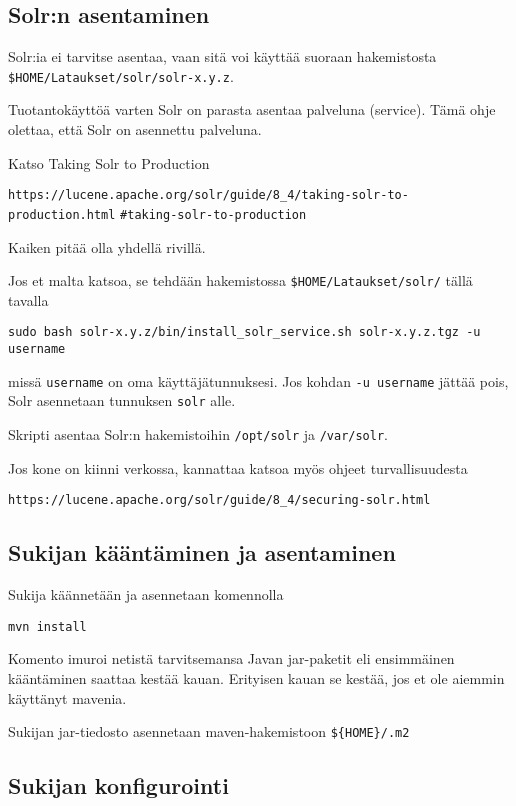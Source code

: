 \documentclass[12pt]{article}
\begin{document}
\subsection*{Solr:n asentaminen}

Solr:ia ei tarvitse asentaa, vaan sitä voi käyttää suoraan
hakemistosta \verb=$HOME/Lataukset/solr/solr-x.y.z=.

Tuotantokäyttöä varten Solr on parasta asentaa palveluna (service).
Tämä ohje olettaa, että Solr on asennettu palveluna.

Katso Taking Solr to Production

{\footnotesize
\verb=https://lucene.apache.org/solr/guide/8_4/taking-solr-to-production.html=
\verb=#taking-solr-to-production=
}

Kaiken pitää olla yhdellä rivillä.

Jos et malta katsoa, se tehdään hakemistossa
\verb=$HOME/Lataukset/solr/= tällä tavalla

{\footnotesize
\verb=sudo bash solr-x.y.z/bin/install_solr_service.sh solr-x.y.z.tgz -u username=
}

missä \verb=username= on oma käyttäjätunnuksesi.
Jos kohdan \verb=-u username= jättää pois, Solr asennetaan tunnuksen
\verb=solr= alle.

Skripti asentaa Solr:n hakemistoihin \verb=/opt/solr= ja
\verb=/var/solr=.

Jos kone on kiinni verkossa, kannattaa katsoa myös ohjeet turvallisuudesta

\verb=https://lucene.apache.org/solr/guide/8_4/securing-solr.html=


\subsection*{Sukijan kääntäminen ja asentaminen}

Sukija käännetään ja asennetaan komennolla

\verb=mvn install=

Komento imuroi netistä tarvitsemansa Javan jar-paketit eli ensimmäinen
kääntäminen saattaa kestää kauan. Erityisen kauan se kestää, jos et
ole aiemmin käyttänyt mavenia.

Sukijan jar-tiedosto asennetaan maven-hakemistoon \verb|${HOME}/.m2|


\subsection*{Sukijan konfigurointi}
\end{document}
